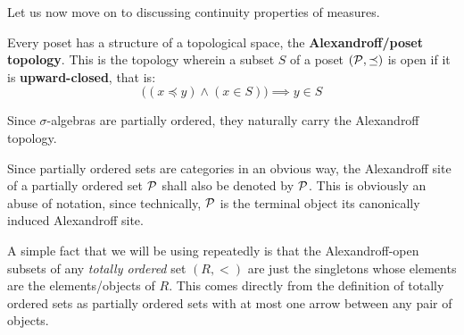         Let us now move on to discussing continuity properties of measures.
        \begin{definition} \label{def: alexandroff_topology}
            Every poset has a structure of a topological space, the \textbf{Alexandroff/poset topology}. This is the topology wherein a subset $S$ of a poset $(\mathcal{P}, \preceq)$ is open if it is \textbf{upward-closed}, that is:
                $$\bigg((x \preceq y) \wedge (x \in S)\bigg) \implies y \in S$$
        \end{definition}
        \begin{remark}
            Since $\sigma$-algebras are partially ordered, they naturally carry the Alexandroff topology. 
        \end{remark}
        \begin{convention}
            Since partially ordered sets are categories in an obvious way, the Alexandroff site of a partially ordered set $\mathcal{P}$ shall also be denoted by $\mathcal{P}$. This is obviously an abuse of notation, since technically, $\mathcal{P}$ is the terminal object its canonically induced Alexandroff site. 
        \end{convention}
        \begin{remark}
            A simple fact that we will be using repeatedly is that the Alexandroff-open subsets of any \textit{totally ordered} set $(R, <)$ are just the singletons whose elements are the elements/objects of $R$. This comes directly from the definition of totally ordered sets as partially ordered sets with at most one arrow between any pair of objects.
        \end{remark}
        
